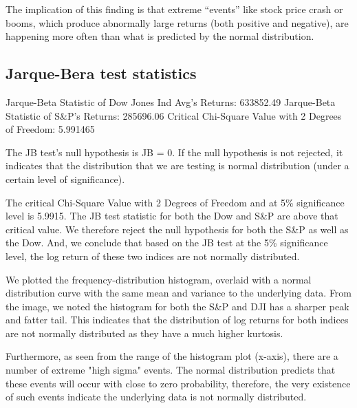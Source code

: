 \documentclass[a4paper]{article}
\begin{document}
The implication of this finding is that extreme “events” like stock price crash or booms, which produce abnormally large returns (both positive and negative), are happening more often than what is predicted by the normal distribution.


\subsection{Jarque-Bera test statistics}
\begin{flushleft}
Jarque-Beta Statistic of Dow Jones Ind Avg's Returns: 633852.49\linebreak
Jarque-Beta Statistic of S\&P's Returns: 285696.06\linebreak
Critical Chi-Square Value with 2 Degrees of Freedom: 5.991465\linebreak
\end{flushleft}

The JB test’s null hypothesis is JB = 0. If the null hypothesis is not rejected, it indicates that the distribution that we are testing is normal distribution (under a certain level of significance).  

The critical Chi-Square Value with 2 Degrees of Freedom and at 5\% significance level is 5.9915. The JB test statistic for both the Dow and S\&P are above that critical value. We therefore reject the null hypothesis for both the S\&P as well as the Dow. And, we conclude that based on the JB test at the 5\% significance level, the log return of these two indices are not normally distributed.

We plotted the frequency-distribution histogram, overlaid with a normal distribution curve with the same mean and variance to the underlying data. From the image, we noted the histogram for both the S\&P and DJI has a sharper peak and fatter tail. This indicates that the distribution of log returns for both indices are not normally distributed as they have a much higher kurtosis.

Furthermore, as seen from the range of the histogram plot (x-axis), there are a number of extreme "high sigma" events. The normal distribution predicts that these events will occur with close to zero probability, therefore, the very existence of such events indicate the underlying data is not normally distributed. 
\end{document}
